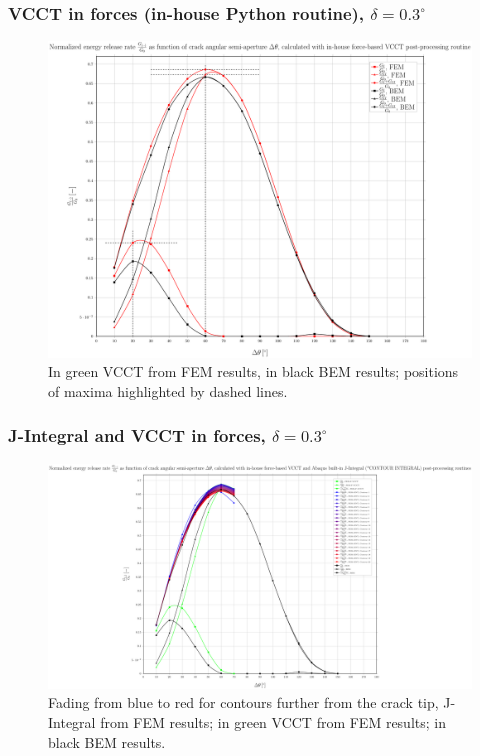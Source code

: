 \documentclass[first,firstsupp,lastsupp,handout,last,hyperref,table]{ETHclass}
\begin{document}
\begin{frame}
\frametitle{\small VCCT in forces (in-house Python routine), $\delta=0.3^{\circ}$}
\vspace{-0.5cm}
\centering
\captionsetup[figure]{font=scriptsize,labelfont=scriptsize}
\begin{figure}[!h]
\centering
\includegraphics[height=0.7\textheight]{2017-07-10_AbqRunSummary_SmallStrainD03_M-F-VCCT_Summary.pdf}
  \caption{\scriptsize In green VCCT from FEM results, in black BEM results; positions of maxima highlighted by dashed lines.}
  \label{fig:res1}
\end{figure}
\end{frame}

\begin{frame}
\frametitle{\small J-Integral and VCCT in forces, $\delta=0.3^{\circ}$}
\vspace{-0.5cm}
\centering
\captionsetup[figure]{font=scriptsize,labelfont=scriptsize}
\begin{figure}[!h]
\centering
\includegraphics[height=0.7\textheight]{2017-07-10_AbqRunSummary_SmallStrainD03_F-VCCT-JINT_Summary.pdf}
  \caption{\scriptsize Fading from blue to red for contours further from the crack tip, J-Integral from FEM results; in green VCCT from FEM results; in black BEM results.}
  \label{fig:res1}
\end{figure}
\end{frame}
\end{document}
